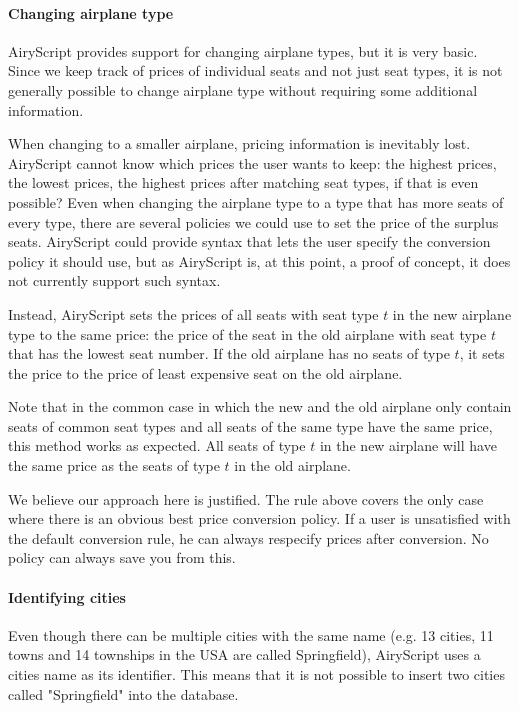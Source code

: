 \paragraph{Changing airplane type}
AiryScript provides support for changing airplane types, but it is very basic.
Since we keep track of prices of individual seats and not just seat types, it is
not generally possible to change airplane type without requiring some additional
information.

When changing to a smaller airplane, pricing information is inevitably lost.
AiryScript cannot know which prices the user wants to keep: the highest prices,
the lowest prices, the highest prices after matching seat types, if that is even
possible? Even when changing the airplane type to a type that has more seats of
every type, there are several policies we could use to set the price of the
surplus seats.  AiryScript could provide syntax that lets the user specify the
conversion policy it should use, but as AiryScript is, at this point, a proof of
concept, it does not currently support such syntax.

Instead, AiryScript sets the prices of all seats with seat type $t$ in the new
airplane type to the same price: the price of the seat in the old airplane with
seat type $t$ that has the lowest seat number. If the old airplane has no seats
of type $t$, it sets the price to the price of least expensive seat on the old
airplane.

Note that in the common case in which the new and the old airplane only contain
seats of common seat types and all seats of the same type have the same price,
this method works as expected. All seats of type $t$ in the new airplane will
have the same price as the seats of type $t$ in the old airplane.

We believe our approach here is justified. The rule above covers the only case
where there is an obvious best price conversion policy. If a user is unsatisfied
with the default conversion rule, he can always respecify prices after
conversion. No policy can always save you from this.

\paragraph{Identifying cities}
Even though there can be multiple cities with the same name (e.g. 13
cities, 11 towns and 14 townships in the USA are called Springfield),
AiryScript uses a cities name as its identifier. This means that it is not
possible to insert two cities called "Springfield" into the database.

